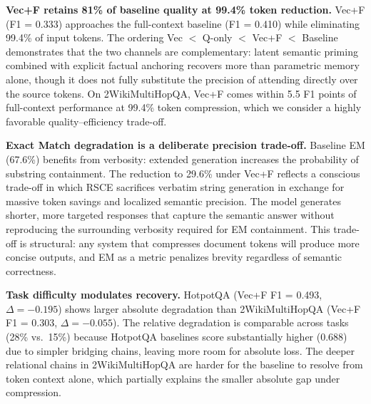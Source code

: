 \documentclass[11pt]{article}
\begin{document}
\textbf{Vec+F retains 81\% of baseline quality at 99.4\% token reduction.} Vec+F (F1 = 0.333) approaches the full-context baseline (F1 = 0.410) while eliminating 99.4\% of input tokens. The ordering Vec $<$ Q-only $<$ Vec+F $<$ Baseline demonstrates that the two channels are complementary: latent semantic priming combined with explicit factual anchoring recovers more than parametric memory alone, though it does not fully substitute the precision of attending directly over the source tokens. On 2WikiMultiHopQA, Vec+F comes within 5.5 F1 points of full-context performance at 99.4\% token compression, which we consider a highly favorable quality--efficiency trade-off.

\textbf{Exact Match degradation is a deliberate precision trade-off.} Baseline EM (67.6\%) benefits from verbosity: extended generation increases the probability of substring containment. The reduction to 29.6\% under Vec+F reflects a conscious trade-off in which RSCE sacrifices verbatim string generation in exchange for massive token savings and localized semantic precision. The model generates shorter, more targeted responses that capture the semantic answer without reproducing the surrounding verbosity required for EM containment. This trade-off is structural: any system that compresses document tokens will produce more concise outputs, and EM as a metric penalizes brevity regardless of semantic correctness.

\textbf{Task difficulty modulates recovery.} HotpotQA (Vec+F F1 = 0.493, $\Delta = -0.195$) shows larger absolute degradation than 2WikiMultiHopQA (Vec+F F1 = 0.303, $\Delta = -0.055$). The relative degradation is comparable across tasks (28\% vs.\ 15\%) because HotpotQA baselines score substantially higher (0.688) due to simpler bridging chains, leaving more room for absolute loss. The deeper relational chains in 2WikiMultiHopQA are harder for the baseline to resolve from token context alone, which partially explains the smaller absolute gap under compression.
\end{document}
